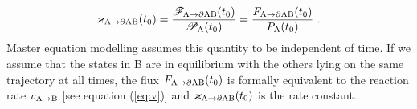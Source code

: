 \begin{equation}
\label{eq:ratecoeff}
{\varkappa}_{\rm A \rightarrow \partial AB } (t_0)
= \frac{\mathscr{F}_{\rm A \rightarrow \partial AB } (t_0)}{\mathscr{P}_{\rm A} (t_0)}
= \frac{F_{\rm A \rightarrow \partial AB } (t_0)}{P_{\rm A} (t_0)} ~.
\end{equation}
Master equation modelling assumes this quantity to be independent of time.
If we assume that the states in B are in equilibrium with the others lying on the same trajectory at all times, the flux $F_{\rm A \rightarrow \partial AB } (t_0)$ is formally equivalent to the reaction rate $v_{\rm A \rightarrow B}$ [see equation (\ref{eq:v})] and ${\varkappa}_{\rm A \rightarrow \partial AB } (t_0)$ is the rate constant.

